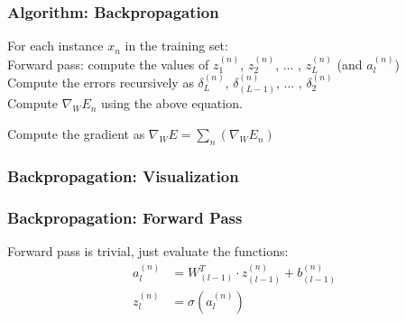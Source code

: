 \documentclass[a4paper,10pt,twoside=true,DIV=10,headsepline,plainheadsepline]{scrartcl}
\begin{document}
	

	\subsubsection{Algorithm: Backpropagation}
		\begin{description}
			\item For each instance $x_n$ in the training set: \\

				Forward pass: compute the values of $z_1^{(n)}$, $z_2^{(n)}$, ... , $z_L^{(n)}$ (and $a_l^{(n)}$) \\
				Compute the errors recursively as $\delta_L^{(n)}$, $\delta_{(L-1)}^{(n)}$, ... , $\delta_2^{(n)}$ \\
				Compute $\nabla_W E_n$ using the above equation.

			\item Compute the gradient as $\nabla_W E = \sum_n (\nabla_W E_n)$
		\end{description} 

	\subsubsection{Backpropagation: Visualization}
	\begin{center}
	\end{center}
	
	\subsubsection{Backpropagation: Forward Pass}
		Forward pass is trivial, just evaluate the functions:
		\begin{align} 
			a_l^{(n)} &= W^T_{(l-1)} \cdot z_{(l-1)}^{(n)} + b_{(l-1)}^{(n)} \\
			z_l^{(n)} &= \sigma (a_l^{(n)}) \\
		\end{align}
\end{document}
